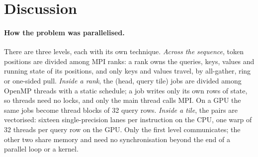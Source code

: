 \section{Discussion}\label{sec:discussion}

\paragraph{How the problem was parallelised.} There are three levels, each with its
own technique. \emph{Across the sequence}, token positions are divided among MPI
ranks: a rank owns the queries, keys, values and running state of its positions,
and only keys and values travel, by all-gather, ring or one-sided pull.
\emph{Inside a rank}, the (head, query tile) jobs are divided among OpenMP threads
with a static schedule; a job writes only its own rows of state, so threads need
no locks, and only the main thread calls MPI. On a GPU the same jobs become thread
blocks of 32 query rows. \emph{Inside a tile}, the pairs are vectorised: sixteen
single-precision lanes per instruction on the CPU, one warp of 32 threads per
query row on the GPU. Only the first level communicates; the other two share
memory and need no synchronisation beyond the end of a parallel loop or a kernel.

